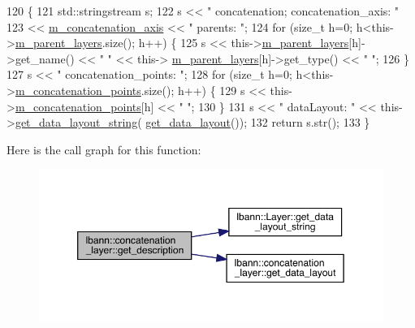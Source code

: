 \begin{DoxyCode}
120                                              \{
121     std::stringstream s;
122     s << \textcolor{stringliteral}{" concatenation; concatenation\_axis: "}
123       << \hyperlink{classlbann_1_1concatenation__layer_a4ac4a931dc85d622e9ea8fddb9625d38}{m\_concatenation\_axis} << \textcolor{stringliteral}{" parents: "};
124     \textcolor{keywordflow}{for} (\textcolor{keywordtype}{size\_t} h=0; h<this->\hyperlink{classlbann_1_1Layer_a3fa7c6cf1a22bb14ab0e85e3dc6027c5}{m\_parent\_layers}.size(); h++) \{
125       s << this->\hyperlink{classlbann_1_1Layer_a3fa7c6cf1a22bb14ab0e85e3dc6027c5}{m\_parent\_layers}[h]->get\_name() << \textcolor{stringliteral}{" "} << this->
      \hyperlink{classlbann_1_1Layer_a3fa7c6cf1a22bb14ab0e85e3dc6027c5}{m\_parent\_layers}[h]->get\_type() << \textcolor{stringliteral}{" "};
126     \}
127     s << \textcolor{stringliteral}{" concatenation\_points: "};
128     \textcolor{keywordflow}{for} (\textcolor{keywordtype}{size\_t} h=0; h<this->\hyperlink{classlbann_1_1concatenation__layer_a363324fe6cd104740334f3396085328c}{m\_concatenation\_points}.size(); h++) \{
129       s << this->\hyperlink{classlbann_1_1concatenation__layer_a363324fe6cd104740334f3396085328c}{m\_concatenation\_points}[h] << \textcolor{stringliteral}{" "};
130     \}
131     s << \textcolor{stringliteral}{" dataLayout: "} << this->\hyperlink{classlbann_1_1Layer_ae3f4a5602df821f4221614b1e3782dc1}{get\_data\_layout\_string}(
      \hyperlink{classlbann_1_1concatenation__layer_afa17d94708fe6d35db2925f664104d42}{get\_data\_layout}());
132     \textcolor{keywordflow}{return} s.str();
133   \}
\end{DoxyCode}
Here is the call graph for this function\+:\nopagebreak
\begin{figure}[H]
\begin{center}
\leavevmode
\includegraphics[width=350pt]{classlbann_1_1concatenation__layer_a2154ad33b4bacbb5caed95fdebc735ca_cgraph}
\end{center}
\end{figure}
\mbox{\label{classlbann_1_1concatenation__layer_aca8e6d21d827a3d5a8434db88bf3e63a}} 

